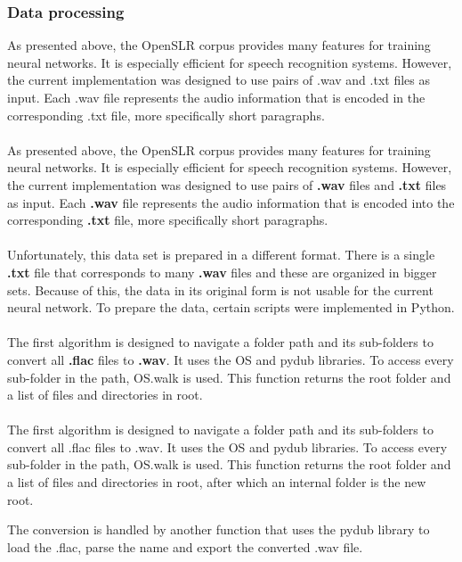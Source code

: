 \subsubsection{Data processing}
As presented above, the OpenSLR corpus provides many features for training neural networks. It is especially efficient for speech recognition systems. However, the current implementation was designed to use pairs of .wav and .txt files as input. Each .wav file represents the audio information that is encoded in the corresponding .txt file, more specifically short paragraphs.\\\\
As presented above, the OpenSLR corpus provides many features for training neural networks. It is especially efficient for speech recognition systems. However, the current implementation was designed to use pairs of \textbf{.wav} files and \textbf{.txt} files as input. Each \textbf{.wav} file represents the audio information that is encoded into the corresponding \textbf{.txt} file, more specifically short paragraphs.\\\\
Unfortunately, this data set is prepared in a different format. There is a single \textbf{.txt} file that corresponds to many \textbf{.wav} files and these are organized in bigger sets. Because of this, the data in its original form is not usable for the current neural network. To prepare the data, certain scripts were implemented in Python.\\\\
The first algorithm is designed to navigate a folder path and its sub-folders to convert all \textbf{.flac} files to \textbf{.wav}. It uses the OS and pydub libraries. 
To access every sub-folder in the path, OS.walk is used. This function returns the root folder and a list of files and directories in root.\\\\
The first algorithm is designed to navigate a folder path and its sub-folders to convert all .flac files to .wav. It uses the OS and pydub libraries. To access every sub-folder in the path, OS.walk is used. This function returns the root folder and a list of files and directories in root, after which an internal folder is the new root.



The conversion is handled by another function that uses the pydub library to load the .flac, parse the name and   export the converted .wav file.

